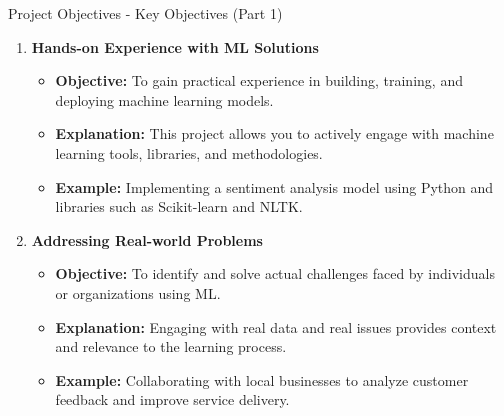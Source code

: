 \documentclass[aspectratio=169]{beamer}
\begin{document}
\begin{frame}[fragile]{Project Objectives - Key Objectives (Part 1)}
    \begin{enumerate}
        \item \textbf{Hands-on Experience with ML Solutions}
        \begin{itemize}
            \item \textbf{Objective:} To gain practical experience in building, training, and deploying machine learning models.
            \item \textbf{Explanation:} This project allows you to actively engage with machine learning tools, libraries, and methodologies.
            \item \textbf{Example:} Implementing a sentiment analysis model using Python and libraries such as Scikit-learn and NLTK.
        \end{itemize}

        \item \textbf{Addressing Real-world Problems}
        \begin{itemize}
            \item \textbf{Objective:} To identify and solve actual challenges faced by individuals or organizations using ML.
            \item \textbf{Explanation:} Engaging with real data and real issues provides context and relevance to the learning process.
            \item \textbf{Example:} Collaborating with local businesses to analyze customer feedback and improve service delivery.
        \end{itemize}
    \end{enumerate}
\end{frame}
\end{document}
